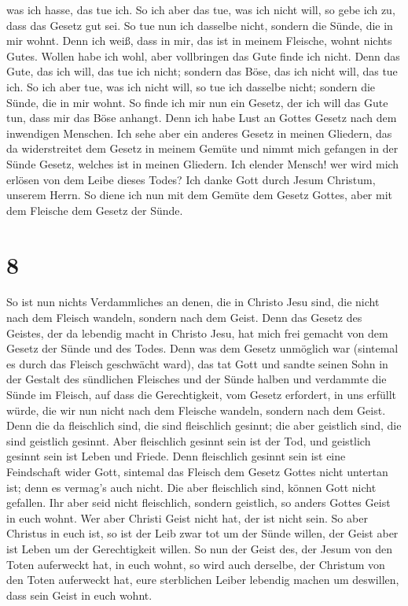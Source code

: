 was ich hasse, das tue ich.  So ich aber das tue, was ich
nicht will, so gebe ich zu, dass das Gesetz gut sei.  So
tue nun ich dasselbe nicht, sondern die Sünde, die in mir wohnt.
 Denn ich weiß, dass in mir, das ist in meinem Fleische,
wohnt nichts Gutes. Wollen habe ich wohl, aber vollbringen das Gute
finde ich nicht.  Denn das Gute, das ich will, das tue
ich nicht; sondern das Böse, das ich nicht will, das tue ich.
 So ich aber tue, was ich nicht will, so tue ich dasselbe
nicht; sondern die Sünde, die in mir wohnt.  So finde ich
mir nun ein Gesetz, der ich will das Gute tun, dass mir das Böse
anhangt.  Denn ich habe Lust an Gottes Gesetz nach dem
inwendigen Menschen.  Ich sehe aber ein anderes Gesetz in
meinen Gliedern, das da widerstreitet dem Gesetz in meinem Gemüte und
nimmt mich gefangen in der Sünde Gesetz, welches ist in meinen Gliedern.
 Ich elender Mensch! wer wird mich erlösen von dem Leibe
dieses Todes?  Ich danke Gott durch Jesum Christum,
unserem Herrn. So diene ich nun mit dem Gemüte dem Gesetz Gottes, aber
mit dem Fleische dem Gesetz der Sünde.

\hypertarget{section-7}{%
\section{8}\label{section-7}}

 So ist nun nichts Verdammliches an denen, die in Christo
Jesu sind, die nicht nach dem Fleisch wandeln, sondern nach dem Geist.
 Denn das Gesetz des Geistes, der da lebendig macht in
Christo Jesu, hat mich frei gemacht von dem Gesetz der Sünde und des
Todes.  Denn was dem Gesetz unmöglich war (sintemal es
durch das Fleisch geschwächt ward), das tat Gott und sandte seinen Sohn
in der Gestalt des sündlichen Fleisches und der Sünde halben und
verdammte die Sünde im Fleisch,  auf dass die
Gerechtigkeit, vom Gesetz erfordert, in uns erfüllt würde, die wir nun
nicht nach dem Fleische wandeln, sondern nach dem Geist. 
Denn die da fleischlich sind, die sind fleischlich gesinnt; die aber
geistlich sind, die sind geistlich gesinnt.  Aber
fleischlich gesinnt sein ist der Tod, und geistlich gesinnt sein ist
Leben und Friede.  Denn fleischlich gesinnt sein ist eine
Feindschaft wider Gott, sintemal das Fleisch dem Gesetz Gottes nicht
untertan ist; denn es vermag's auch nicht.  Die aber
fleischlich sind, können Gott nicht gefallen.  Ihr aber
seid nicht fleischlich, sondern geistlich, so anders Gottes Geist in
euch wohnt. Wer aber Christi Geist nicht hat, der ist nicht sein.
 So aber Christus in euch ist, so ist der Leib zwar tot
um der Sünde willen, der Geist aber ist Leben um der Gerechtigkeit
willen.  So nun der Geist des, der Jesum von den Toten
auferweckt hat, in euch wohnt, so wird auch derselbe, der Christum von
den Toten auferweckt hat, eure sterblichen Leiber lebendig machen um
deswillen, dass sein Geist in euch wohnt.

